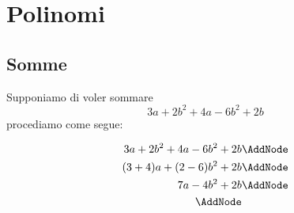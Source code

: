 \chapter{Polinomi}
\label{cha:polinomi}

\section{Somme}
\label{sec:somme}
\begin{esempiot}{}{}
Supponiamo di voler sommare\[ 3a+2b^2+4a-6b^2+2b\] procediamo come segue:
	 \begin{NodesList} %
	 	\begin{align*}
	 		3a+2b^2+4a-6b^2+2b&                           \AddNode\\
	 		(3+4)a+(2-6)b^2+2b&          \AddNode\\                                       		
	 		7a-4b^2+2b&   \AddNode\\
	 		\AddNode
	 	\end{align*}
	  \end{NodesList}
\end{esempiot}
